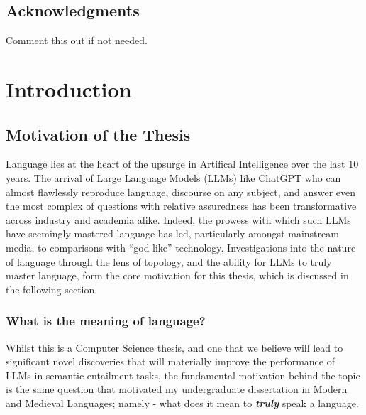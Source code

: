 \documentclass[12pt,twoside]{report}
\begin{document}
\section*{Acknowledgments}
Comment this out if not needed.

\clearpage{\pagestyle{empty}\cleardoublepage}

\tableofcontents 


\clearpage{\pagestyle{empty}\cleardoublepage}
\setcounter{page}{1}
\fancyhead[LE,RO]{\slshape \rightmark}
\fancyhead[LO,RE]{}

\chapter{Introduction}
\section{Motivation of the Thesis}
Language lies at the heart of the upsurge in Artifical Intelligence over the last 10 years. The arrival of Large Language Models (LLMs) like ChatGPT who can almost flawlessly reproduce language, discourse on any subject, and answer even the most complex of questions with relative assuredness has been transformative across industry and academia alike. Indeed, the prowess with which such LLMs have seemingly mastered language has led, particularly amongst mainstream media, to comparisons with ``god-like'' technology. \cite{hogarthFT} Investigations into the nature of language through the lens of topology, and the ability for LLMs to truly master language, form the core motivation for this thesis, which is discussed in the following section. 


\subsection{What is the meaning of language?}

Whilst this is a Computer Science thesis, and one that we believe will lead to significant novel discoveries that will materially improve the performance of LLMs in semantic entailment tasks, the fundamental motivation behind the topic is the same question that motivated my undergraduate dissertation in Modern and Medieval Languages; namely - what does it mean to \textbf{\textit{truly}} speak a language. \newline \par
\end{document}
